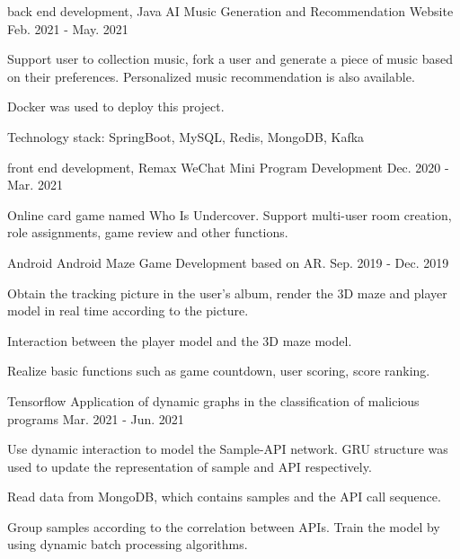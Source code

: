 \begin{cventries}
  \cventry
    {back end development, Java}
    {AI Music Generation and Recommendation Website}
    {}
    {Feb. 2021 - May. 2021}
    {
      \begin{cvitems}
        \item {Support user to collection music, fork a user and generate a piece of music based on their preferences. Personalized music recommendation is also available.}
        \item {Docker was used to deploy this project.}
        \item {Technology stack: SpringBoot, MySQL, Redis, MongoDB, Kafka}
      \end{cvitems}
    }
  \cventry
    {front end development, Remax}
    {WeChat Mini Program Development}
    {}
    {Dec. 2020 - Mar. 2021}
    {
      \begin{cvitems}
        \item {Online card game named Who Is Undercover.  Support multi-user room creation, role assignments, game review and other functions.}
      \end{cvitems}
    }

    \cventry
    {Android}
    {Android Maze Game Development based on AR.}
    {}
    {Sep. 2019 - Dec. 2019}
    {
      \begin{cvitems}
        \item {Obtain the tracking picture in the user's album, render the 3D maze and player model in real time according to the picture.
        }
        \item{Interaction between the player model and the 3D maze model.}
        \item{Realize basic functions such as game countdown, user scoring, score ranking.}
      \end{cvitems}
    }
    
  \cventry
    {Tensorflow}
    {Application of dynamic graphs in the classification of malicious programs}
    {}
    {Mar. 2021 - Jun. 2021}
    {
      \begin{cvitems}
        \item {Use dynamic interaction to model the Sample-API network. GRU structure was used to update the representation of sample and API respectively.}
        \item {Read data from MongoDB, which contains samples and the API call sequence.}
        \item {Group samples according to the correlation between APIs. Train the model by using dynamic batch processing algorithms.}
      \end{cvitems}
    }
\end{cventries}
